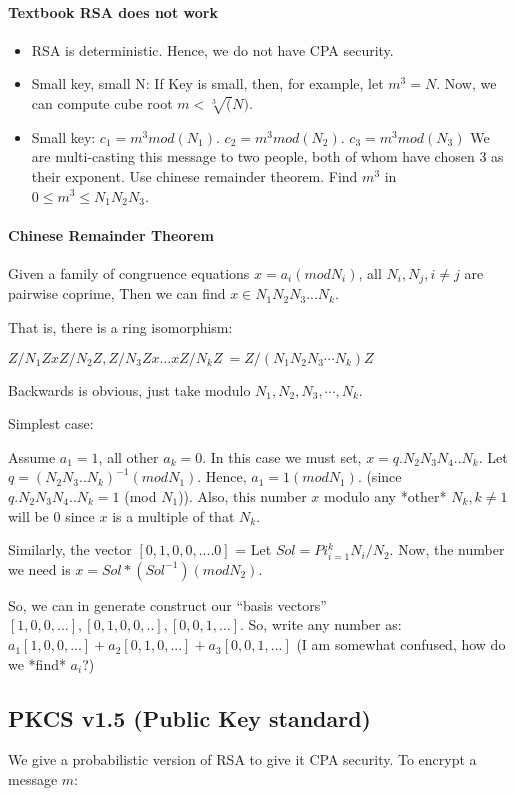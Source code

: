 \paragraph{Textbook RSA does not work}
\begin{itemize}
\item RSA is deterministic. Hence, we do not have CPA security.
\item Small key, small N: If Key is small, then, for example, let $m^3 = N$. Now, we can compute cube root $m < \sqrt[3](N)$.
\item Small key:  $c_1 = m^3 mod (N_1)$. $c_2 = m^3 mod (N_2)$. $c_3 = m^3 mod (N_3)$ We are multi-casting
  this message to two people, both of whom have chosen $3$ as their exponent.
  Use chinese remainder theorem. Find $m^3$ in $0 \leq m^3 \leq N_1N_2N_3$.
\end{itemize}

\paragraph{Chinese Remainder Theorem}

Given a family of congruence equations $x = a_i (mod N_i)$, all $N_i, N_j, i \neq j$ are pairwise coprime,
Then we can find $x \in N_1N_2N_3...N_k$.

That is, there is a ring isomorphism:

$Z/N_1Z x Z/N_2Z, Z/N_3Z x ... x Z/N_kZ ~= Z/(N_1N_2N_3 \cdots N_k)Z$

Backwards is obvious, just take modulo $N_1, N_2, N_3, \cdots, N_k$.

Simplest case:

Assume $a_1 = 1$, all other $a_k = 0$. In this case we must set, $x = q.N_2N_3N_4..N_k$.
Let $q = (N_2N_3..N_k)^{-1} (mod N_1)$. Hence, $a_1 = 1 (mod N_1)$. (since $q.N_2N_3N_4..N_k = 1$ (mod $N_1$)).
Also, this number $x$ modulo any *other* $N_k, k \neq 1$ will be $0$ since $x$ is a multiple of that $N_k$.

Similarly, the vector
$[0, 1, 0, 0, ....0]$ = Let  $ Sol= Pi_{i = 1}^k N_i / N_2$. Now, the number we need is $x = Sol*(Sol^{-1}) (mod N_2)$.

So, we can in generate construct our ``basis vectors'' $[1, 0, 0, ...], [0, 1, 0, 0, ..], [0, 0, 1, ...]$.
So, write any number as:
$a_1 [1, 0, 0, ...] + a_2 [0, 1, 0, ...] + a_3 [0, 0, 1, ...]$ (I am somewhat confused, how do we *find* $a_i$?)


\subsection{PKCS v1.5 (Public Key standard)}
We give a probabilistic version of RSA to give it CPA security. To encrypt a message $m$:

